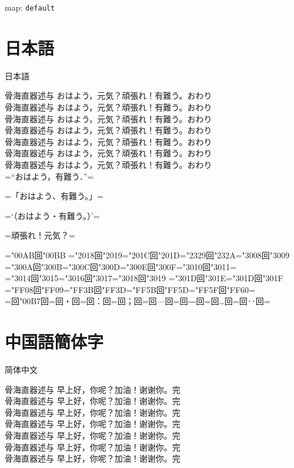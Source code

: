 \documentclass[landscape]{utarticle}
\def\map{default}
\begin{document}
\parindent0mm
map: \texttt{\map}

\section{日本語}
\upjpngtb 日本語

\upjpnrml 骨海直器述与 おはよう，元気？頑張れ！有難う。おわり\\
\upjpnrmm 骨海直器述与 おはよう，元気？頑張れ！有難う。おわり\\
\upjpnrmb 骨海直器述与 おはよう，元気？頑張れ！有難う。おわり\\
\upjpngtm 骨海直器述与 おはよう，元気？頑張れ！有難う。おわり\\
\upjpngtb 骨海直器述与 おはよう，元気？頑張れ！有難う。おわり\\
\upjpngte 骨海直器述与 おはよう，元気？頑張れ！有難う。おわり\\
\upjpngth 骨海直器述与 おはよう，元気？頑張れ！有難う。おわり\\

\upjpnrmm
=“おはよう，有難う．”=

=「おはよう、有難う。」=

=‘（おはよう・有難う。）’=

=頑張れ！元気？=

=\kchar"00AB回\kchar"00BB%
=\kchar"2018回\kchar"2019=\kchar"201C回\kchar"201D=\kchar"2329回\kchar"232A=\kchar"3008回\kchar"3009%
=\kchar"300A回\kchar"300B=\kchar"300C回\kchar"300D=\kchar"300E回\kchar"300F=\kchar"3010回\kchar"3011=\\
=\kchar"3014回\kchar"3015=\kchar"3016回\kchar"3017=\kchar"3018回\kchar"3019%
=\kchar"301D回\kchar"301E=\kchar"301D回\kchar"301F%
=\kchar"FF08回\kchar"FF09=\kchar"FF3B回\kchar"FF3D=\kchar"FF5B回\kchar"FF5D=\kchar"FF5F回\kchar"FF60=\\
=回\kchar"00B7回=回・回=回：回=回；回=回—回=回―回=回…回=回‥回=


\section{中国語簡体字}
\upschgtb 简体中文

\upschrml 骨海直器述与 早上好，你呢？加油！谢谢你。完\\
\upschrmm 骨海直器述与 早上好，你呢？加油！谢谢你。完\\
\upschrmb 骨海直器述与 早上好，你呢？加油！谢谢你。完\\
\upschgtm 骨海直器述与 早上好，你呢？加油！谢谢你。完\\
\upschgtb 骨海直器述与 早上好，你呢？加油！谢谢你。完\\
\upschgte 骨海直器述与 早上好，你呢？加油！谢谢你。完\\
\upschgth 骨海直器述与 早上好，你呢？加油！谢谢你。完\\
\end{document}
